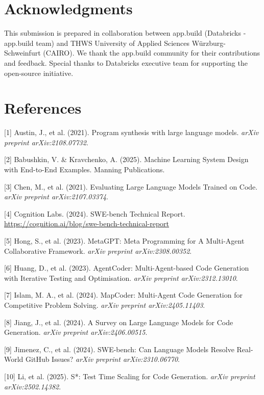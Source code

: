 \documentclass{article}
\begin{document}
\section*{Acknowledgments}

This submission is prepared in collaboration between app.build (Databricks - app.build team) and THWS University of Applied Sciences W\"urzburg-Schweinfurt (CAIRO). We thank the app.build community for their contributions and feedback. Special thanks to Databricks executive team for supporting the open-source initiative.

\section*{References}


\small

[1] Austin, J., et al. (2021). Program synthesis with large language models. \textit{arXiv preprint arXiv:2108.07732}.

[2] Babushkin, V. \& Kravchenko, A. (2025). Machine Learning System Design with End-to-End Examples. Manning Publications.

[3] Chen, M., et al. (2021). Evaluating Large Language Models Trained on Code. \textit{arXiv preprint arXiv:2107.03374}.

[4] Cognition Labs. (2024). SWE-bench Technical Report. \url{https://cognition.ai/blog/swe-bench-technical-report}

[5] Hong, S., et al. (2023). MetaGPT: Meta Programming for A Multi-Agent Collaborative Framework. \textit{arXiv preprint arXiv:2308.00352}.

[6] Huang, D., et al. (2023). AgentCoder: Multi-Agent-based Code Generation with Iterative Testing and Optimisation. \textit{arXiv preprint arXiv:2312.13010}.

[7] Islam, M. A., et al. (2024). MapCoder: Multi-Agent Code Generation for Competitive Problem Solving. \textit{arXiv preprint arXiv:2405.11403}.

[8] Jiang, J., et al. (2024). A Survey on Large Language Models for Code Generation. \textit{arXiv preprint arXiv:2406.00515}.

[9] Jimenez, C., et al. (2024). SWE-bench: Can Language Models Resolve Real-World GitHub Issues? \textit{arXiv preprint arXiv:2310.06770}.

[10] Li, et al. (2025). S*: Test Time Scaling for Code Generation. \textit{arXiv preprint arXiv:2502.14382}.
\end{document}
